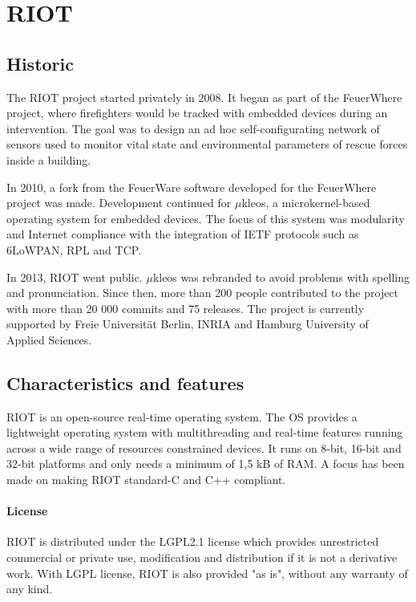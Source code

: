 \section{RIOT}

\subsection{Historic}

The RIOT project started privately in 2008.
It began as part of the FeuerWhere project\cite{FeuerWhere}, 
    where firefighters would be tracked with embedded devices during an intervention.
The goal was to design an ad hoc self-configurating network of sensors used 
    to monitor vital state and environmental parameters of rescue forces inside a building.

In 2010, a fork from the FeuerWare software developed for the FeuerWhere project was made.
Development continued for $\mu$kleos\cite{microkleos}, a microkernel-based operating system for embedded devices.
The focus of this system was modularity and Internet compliance with the integration of IETF protocols such as 6LoWPAN, RPL and TCP.

In 2013, RIOT went public.
$\mu$kleos was rebranded to avoid problems with spelling and pronunciation.
Since then, more than 200 people contributed to the project with more than 20 000 commits and 75 releases.
The project is currently supported by Freie Universität Berlin, INRIA and Hamburg University of Applied Sciences.

\subsection{Characteristics and features}
RIOT is an open-source real-time operating system.
The OS provides a lightweight operating system with multithreading and real-time features running across a wide range of resources constrained devices.
It runs on 8-bit, 16-bit and 32-bit platforms and only needs a minimum of 1,5 kB of RAM.
A focus has been made on making RIOT standard-C and C++ compliant.

\paragraph{License} RIOT is distributed under the LGPL2.1 license which provides unrestricted commercial or private use, modification and distribution if it is not a derivative work.
With LGPL license, RIOT is also provided "as is", without any warranty of any kind.


